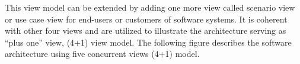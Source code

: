 \documentclass[10pt,oneside]{report}
\begin{document}
This view model can be extended by adding one more view called scenario view or use case view for end-users or customers of software systems. It is coherent with other four views and are utilized to illustrate the architecture serving as “plus one” view, (4+1) view model. The following figure describes the software architecture using five concurrent views (4+1) model.



\end{document}
